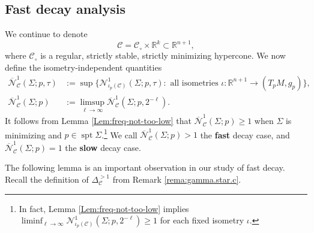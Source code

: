 \documentclass[11pt, letterpaper, reqno]{amsart}
\numberwithin{equation}{section}
\theoremstyle{remark}
\newcommand{\RR}{\mathbb{R}}
\newcommand{\cC}{\mathcal{C}}
\newcommand{\cN}{\mathcal{N}}
\newcommand{\spt}{\operatorname{spt}}
\begin{document}
\subsection{Fast decay analysis} \label{sec:nonlinear.hf}

We continue to denote
\[ \cC = \cC_\circ \times \RR^k \subset \RR^{n+1}, \]
where $\cC_\circ$ is a regular, strictly stable, strictly minimizing hypercone. 
We now define the isometry-independent quantities
\begin{align*}
\overline{\cN}^{1}_{\cC}(\Sigma;p,\tau) & := \sup \{ \cN^{1}_{\iota_p(\cC)}(\Sigma;p,\tau) : \text{ all isometries } \iota : \RR^{n+1} \to (T_p M, g_p) \}, \\
\overline{\cN}^{1}_{\cC}(\Sigma;p) & := \limsup_{\ell\to\infty} \overline{\cN}^{1}_{\cC}(\Sigma; p, 2^{-\ell}).
\end{align*}
It follows from Lemma \ref{Lem:freq-not-too-low} that $\overline{\cN}^{1}_{\cC}(\Sigma; p) \geq 1$ when $\Sigma$ is minimizing and $p \in \spt \Sigma$.\footnote{In fact, Lemma \ref{Lem:freq-not-too-low} implies $\liminf_{\ell \to \infty} \cN^{1}_{\iota_p(\cC)}(\Sigma; p, 2^{-\ell}) \geq 1$ for each fixed isometry $\iota$.}  We call $\overline{\cN}^{1}_{\cC}(\Sigma;p)>1$ the \textbf{fast} decay case, and $\overline{\cN}^{1}_{\cC}(\Sigma;p)=1$ the \textbf{slow} decay case.

The following lemma is an important observation in our study of fast decay. Recall the definition of $\Delta_{\cC}^{>1}$ from Remark \ref{rema:gamma.star.c}.
\end{document}
